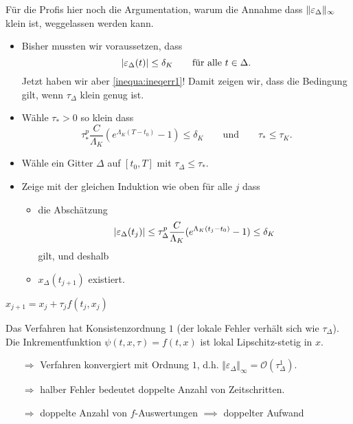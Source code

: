 Für die Profis hier noch die Argumentation, warum die Annahme dass $\lVert \varepsilon_\Delta \rVert_\infty$
klein ist, weggelassen werden kann.
\begin{itemize}
	\item Bisher mussten wir voraussetzen, dass
	\begin{equation*}
		\lvert \varepsilon_{\Delta} (t) \rvert \leq \delta_K
		\qquad \text{für alle $t \in \Delta$.}
	\end{equation*}
	Jetzt haben wir aber \eqref{inequa:ineqerr1}!  Damit zeigen wir, dass die Bedingung gilt, wenn $\tau_\Delta$ klein genug ist.
	
	\item Wähle $\tau_* > 0$ so klein dass
	\begin{equation*}
		\tau_*^p \frac{C}{\Lambda_K} (e^{\Lambda_K(T-t_0)}-1) \le \delta_K
		\qquad \text{und} \qquad
		\tau_* \le \tau_K.
	\end{equation*}
	
	\item Wähle ein Gitter $\Delta$ auf $[t_0,T]$ mit $\tau_\Delta \le \tau_*$.
	
	\item Zeige mit der gleichen Induktion wie oben für alle $j$ dass
	\begin{itemize}
		\item die Abschätzung
		\begin{equation*}
			\lvert \varepsilon_\Delta(t_j) \rvert
			\le
			\tau_\Delta^p \frac{C}{\Lambda_K} (e^{\Lambda_K(t_j-t_0)}-1) \le \delta_K
		\end{equation*}
		gilt, und deshalb
		\item $x_\Delta(t_{j+1})$ existiert.
	\end{itemize}
\end{itemize}
	
	
\begin{bsp}
	$x_{j+1}=x_j+\tau_j f (t_j,x_j)$
	
	Das Verfahren hat Konsistenzordnung $1$ (der lokale Fehler verhält sich wie $\tau_{\Delta}$). Die Inkrementfunktion $\psi(t,x,\tau) = f(t,x)$ ist lokal Lipschitz-stetig in $x$.
	\begin{itemize}[leftmargin=*]
		\item[$\Rightarrow$] Verfahren konvergiert mit Ordnung $1$, d.h. $\Vert \varepsilon_{\Delta} \Vert_{\infty}=\mathcal{O} (\tau_{\Delta}^1 )$.
		\item[$\Rightarrow$] halber Fehler bedeutet doppelte Anzahl von Zeitschritten.
		\item[$\Rightarrow$] doppelte Anzahl von $f$-Auswertungen $\implies$ doppelter Aufwand
	\end{itemize}
\end{bsp}


